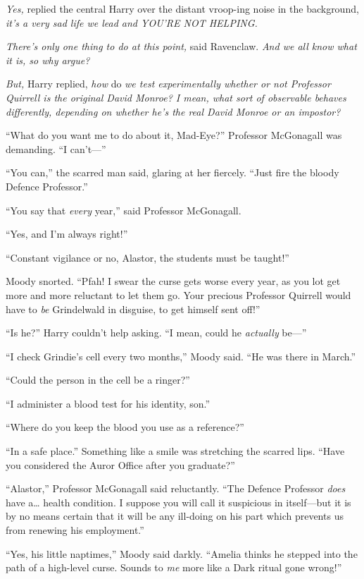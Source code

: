 \emph{Yes,} replied the central Harry over the distant vroop-ing noise
in the background, \emph{it's a very sad life we lead and YOU'RE NOT
HELPING.}

\emph{There's only one thing to do at this point,} said Ravenclaw.
\emph{And we all know what it is, so why argue?}

\emph{But,} Harry replied, \emph{how} do \emph{we test experimentally
whether or not Professor Quirrell is the original David Monroe? I mean,
what sort of observable behaves differently, depending on whether he's
the real David Monroe or an impostor?}

``What do you want me to do about it, Mad-Eye?'' Professor McGonagall
was demanding. ``I can't---''

``You can,'' the scarred man said, glaring at her fiercely. ``Just fire
the bloody Defence Professor.''

``You say that \emph{every} year,'' said Professor McGonagall.

``Yes, and I'm always right!''

``Constant vigilance or no, Alastor, the students must be taught!''

Moody snorted. ``Pfah! I swear the curse gets worse every year, as you
lot get more and more reluctant to let them go. Your precious Professor
Quirrell would have to \emph{be} Grindelwald in disguise, to get himself
sent off!''

``Is he?'' Harry couldn't help asking. ``I mean, could he
\emph{actually} be---''

``I check Grindie's cell every two months,'' Moody said. ``He was there
in March.''

``Could the person in the cell be a ringer?''

``I administer a blood test for his identity, son.''

``Where do you keep the blood you use as a reference?''

``In a safe place.'' Something like a smile was stretching the scarred
lips. ``Have you considered the Auror Office after you graduate?''

``Alastor,'' Professor McGonagall said reluctantly. ``The Defence
Professor \emph{does} have a\ldots{} health condition. I suppose you
will call it suspicious in itself---but it is by no means certain that
it will be any ill-doing on his part which prevents us from renewing his
employment.''

``Yes, his little naptimes,'' Moody said darkly. ``Amelia thinks he
stepped into the path of a high-level curse. Sounds to \emph{me} more
like a Dark ritual gone wrong!''

